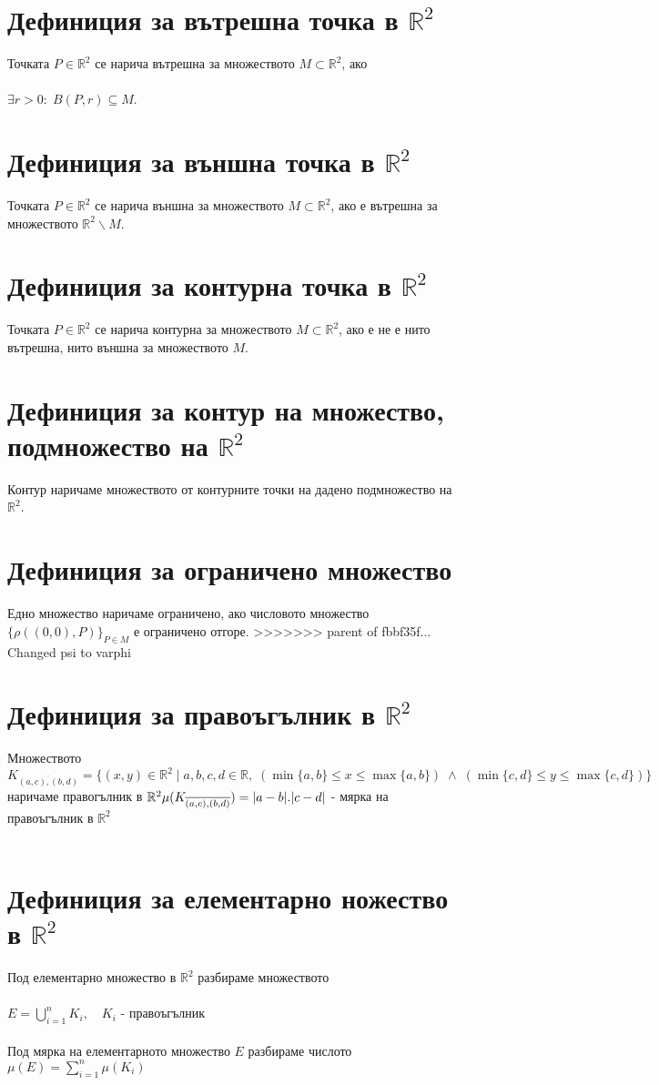 \documentclass[14pt]{extarticle}
\newcommand{\R}{\mathbb{R}}
\newcommand{\Sum}{\displaystyle\sum}
\begin{document}
\section*{Дефиниция за вътрешна точка в \(\R^2\)}
Точката \(P \in \R^2\) се нарича вътрешна за множеството \(M \subset \R^2\), ако \\\\
\(\exists r > 0 : \; B(P,r) \subseteq M\).
\section*{Дефиниция за външна точка в \(\R^2\)}
Точката \(P \in \R^2\) се нарича външна за множеството \(M \subset \R^2\), ако е вътрешна за множеството \(\R^2\backslash M\).
\section*{Дефиниция за контурна точка в \(\R^2\)}
Точката \(P \in \R^2\) се нарича контурна за множеството \(M \subset \R^2\), ако е не е нито вътрешна, нито външна за множеството \(M\).
\section*{Дефиниция за контур на множество, подмножество на \(\R^2\)}
Контур наричаме множеството от контурните точки на дадено подмножество на \(\R^2\).
\section*{Дефиниция за ограничено множество}
Едно множество наричаме ограничено, ако числовото множество \(\{\rho((0, 0), P)\}_{P \in M}\) е ограничено отгоре.
>>>>>>> parent of fbbf35f... Changed psi to varphi
\section*{Дефиниция за правоъгълник в \(\R^2\)}
Множеството \(K_{\overline{(a, c), (b, d)}} = \{(x, y) \in \R^2 \; | \; a, b, c, d \in \R, \;  (\min\{a, b\} \leq x \leq \max\{a, b\}) \; \land \; (\min\{c, d\} \leq y \leq \max\{c, d\}) \}\) наричаме правогълник в \(\R^2 \\\\
\mu(K_{\overline{(a, c), (b, d)}}) = |a - b|.|c - d|\) - мярка на правоъгълник в \(\R^2\) \\\\
\section*{Дефиниция за елементарно ножество в \(\R^2\)}
Под елементарно множество в \(\R^2\) разбираме множеството \\\\
\(E = \bigcup_{i = 1}^n K_i, \quad K_i\) - правоъгълник \\\\
Под мярка на елементарното множество \(E\) разбираме числото \(\mu(E) = \Sum_{i = 1}^n \mu(K_i)\)
\end{document}
